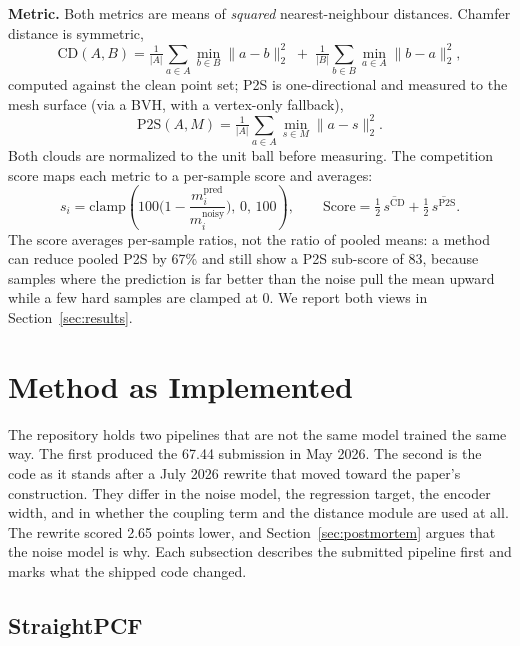 \documentclass{article}
\begin{document}
\textbf{Metric.} Both metrics are means of \emph{squared} nearest-neighbour distances. Chamfer distance is symmetric,
\begin{equation}
\mathrm{CD}(A, B) = \tfrac{1}{|A|}\sum_{a \in A} \min_{b \in B}\|a-b\|_2^2 \;+\; \tfrac{1}{|B|}\sum_{b \in B} \min_{a \in A}\|b-a\|_2^2 ,
\end{equation}
computed against the clean point set; P2S is one-directional and measured to the mesh surface (via a BVH, with a vertex-only fallback),
\begin{equation}
\mathrm{P2S}(A, M) = \tfrac{1}{|A|}\sum_{a \in A} \min_{s \in M}\|a-s\|_2^2 .
\end{equation}
Both clouds are normalized to the unit ball before measuring. The competition score maps each metric to a per-sample score and averages:
\begin{equation}
s_i = \mathrm{clamp}\!\left(100\Big(1 - \frac{m_i^{\text{pred}}}{m_i^{\text{noisy}}}\Big),\, 0,\, 100\right),
\qquad
\text{Score} = \tfrac{1}{2}\,\overline{s^{\text{CD}}} + \tfrac{1}{2}\,\overline{s^{\text{P2S}}} .
\end{equation}
The score averages per-sample ratios, not the ratio of pooled means: a method can reduce pooled P2S by 67\% and still show a P2S sub-score of 83, because samples where the prediction is far better than the noise pull the mean upward while a few hard samples are clamped at 0. We report both views in Section~\ref{sec:results}.

\section{Method as Implemented}
\label{sec:method}

The repository holds two pipelines that are not the same model trained the same way. The first produced the 67.44 submission in May 2026. The second is the code as it stands after a July 2026 rewrite that moved toward the paper's construction. They differ in the noise model, the regression target, the encoder width, and in whether the coupling term and the distance module are used at all. The rewrite scored 2.65 points lower, and Section~\ref{sec:postmortem} argues that the noise model is why. Each subsection describes the submitted pipeline first and marks what the shipped code changed.

\subsection{StraightPCF}
\end{document}

